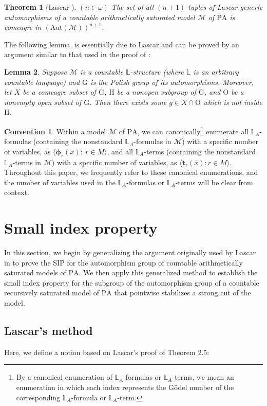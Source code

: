 \documentclass[11pt]{article}
\newtheorem{theorem}{Theorem}[section]
\theoremstyle{plain}
\newtheorem{lem}[theorem]{Lemma}
\theoremstyle{definition}
\newtheorem*{con}{Convention}
\newcommand{\M}{\mathcal{M}}
\newcommand{\G}{\mathrm{G}}
\newcommand{\A}{\mathrm{Aut}}
\newcommand{\pa}{\mathrm{PA}}
\begin{document}
\begin{theorem}[Lascar \cite{las}]
$(n\in\omega)$	The set of all $(n+1)$-tuples of Lascar generic automorphisms of a countable arithmetically saturated model $ \M $ of $ \pa $ is comeagre in $ (\A(\M))^{n+1} $.
\end{theorem}
The following lemma, is essentially due to Lascar \cite{las} and can be proved by an argument similar to that used in the proof of  \cite[Propositon 6.2]{km}:
\begin{lem}
Suppose $\M$ is a countable $\mathbb{L}$-structure (where $\mathbb{L}$ is an arbitrary countable language) and $\G$ is the Polish group of its automorphisms. Moreover, let $X$ be a comeagre subset of $\G$, $\mathrm{H}$ be a nonopen subgroup of $\G$, and $\mathrm{O}$ be a nonempty open subset of $\G$. Then there exists some $g\in X\cap\mathrm{O}$ which is not inside $\mathrm{H}$.
\end{lem}
\begin{con}
Within a  model $\M$ of $\pa$, we can   canonically\footnote{By a canonical enumeration of $\mathbb{L}_{A}$-formulas or $\mathbb{L}_{A}$-terms, we mean an enumeration in which each index represents the G\"{o}del number of the corresponding $\mathbb{L}_{A}$-formula or $\mathbb{L}_{A}$-term.}  enumerate all $\mathbb{L}_{A}$-formulas (containing the nonstandard $\mathbb{L}_{A}$-formulas in $\M$) with a specific number of variables, as $\langle \bm{\phi}_{r}(\bar{x}): \ r\in M\rangle$, and all $\mathbb{L}_{A}$-terms (containing the nonstandard $\mathbb{L}_{A}$-terms in $\M$) with a specific number of variables, as $\langle \textbf{t}_{r}(\bar{x}): r\in M\rangle$.  Throughout this paper, we frequently refer to these canonical enumerations, and the number of variables used in the $\mathbb{L}_{A}$-formulas or $\mathbb{L}_{A}$-terms will be clear from  context.
\end{con}
\section{Small index property }
In this section, we begin by generalizing the argument originally used by Lascar in \cite{las}  to prove the SIP for the automorphism group of countable arithmetically saturated models of $\pa$. We then apply this generalized method to establish the small index property  for  the subgroup of the automorphism group of a countable recursively saturated model of $\pa$ that pointwise stabilizes a strong cut of the model.

\subsection{Lascar's method}
Here, we define a notion based on Lascar's proof of Theorem 2.5:
\end{document}
